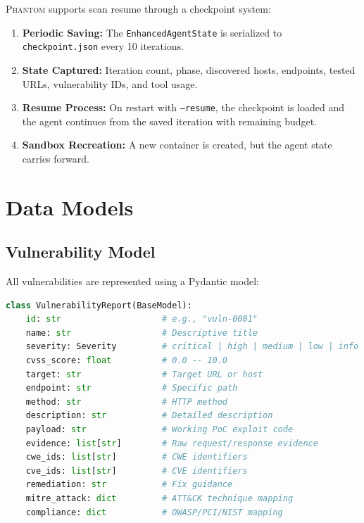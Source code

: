 \documentclass[12pt,a4paper,twoside]{report}
\makeatletter
\newcommand{\phantom@}{\textsc{Phantom}}
\makeatother
\begin{document}
\phantom@{} supports scan resume through a checkpoint system:

\begin{infobox}
\begin{enumerate}
    \item \textbf{Periodic Saving:} The \texttt{EnhancedAgentState} is serialized to \texttt{checkpoint.json} every 10 iterations.
    \item \textbf{State Captured:} Iteration count, phase, discovered hosts, endpoints, tested URLs, vulnerability IDs, and tool usage.
    \item \textbf{Resume Process:} On restart with \texttt{--resume}, the checkpoint is loaded and the agent continues from the saved iteration with remaining budget.
    \item \textbf{Sandbox Recreation:} A new container is created, but the agent state carries forward.
\end{enumerate}
\end{infobox}


\chapter{Data Models}
\label{ch:models}

\section{Vulnerability Model}

All vulnerabilities are represented using a Pydantic model:

\begin{lstlisting}[language=Python, caption={Simplified Vulnerability model.}]
class VulnerabilityReport(BaseModel):
    id: str                    # e.g., "vuln-0001"
    name: str                  # Descriptive title
    severity: Severity         # critical | high | medium | low | info
    cvss_score: float          # 0.0 -- 10.0
    target: str                # Target URL or host
    endpoint: str              # Specific path
    method: str                # HTTP method
    description: str           # Detailed description
    payload: str               # Working PoC exploit code
    evidence: list[str]        # Raw request/response evidence
    cwe_ids: list[str]         # CWE identifiers
    cve_ids: list[str]         # CVE identifiers
    remediation: str           # Fix guidance
    mitre_attack: dict         # ATT&CK technique mapping
    compliance: dict           # OWASP/PCI/NIST mapping
\end{lstlisting}
\end{document}
